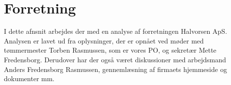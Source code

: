 \section{Forretning} \label{forretning}

I dette afnsnit arbejdes der med en analyse af forretningen Halvorsen ApS.
Analysen er lavet ud fra oplysninger, der er opnået ved møder med tømmermester Torben Rasmussen, som er vores PO, og sekretær Mette Fredensborg. Derudover har der også været diskussioner med arbejdsmand Anders Fredensborg Rasmussen, gennemlæsning af firmaets hjemmeside og dokumenter mm.





